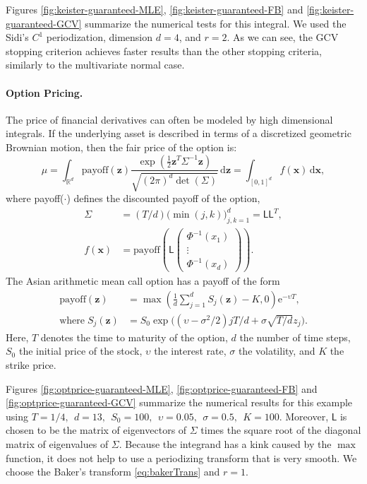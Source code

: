 \documentclass[twocolumn]{svjour3}          %
\newcommand{\bm}[1]{\boldsymbol{#1}}
\newcommand{\mSigma}{\mathsf{\Sigma}}
\newcommand{\dif}[1]{\text{d}{#1}}
\newcommand{\reals}{\mathbb{R}}
\newcommand{\vx}{\bm{x}}
\newcommand{\dvx}{\dif{\bm{x}}}
\newcommand{\vz}{\bm{z}}
\newcommand{\dvz}{\dif{\bm{z}}}
\newcommand{\mL}{\mathsf{L}}
\newcommand{\me}{\mathrm{e}}
\begin{document}
Figures \ref{fig:keister-guaranteed-MLE}, \ref{fig:keister-guaranteed-FB} and \ref{fig:keister-guaranteed-GCV} summarize the numerical tests for this integral.  We used the Sidi's $C^1$ periodization, dimension $d=4$, and $r=2$. 
As we can see, the GCV stopping criterion achieves faster results than the other stopping criteria, similarly to the multivariate normal case.

\paragraph{Option Pricing.}

The price of financial derivatives can often be modeled by high dimensional integrals. If the underlying asset is described in terms of a discretized geometric Brownian motion, then the fair price of the option is:
\begin{equation*}
\mu = \int_{\reals^d} \text{payoff}(\vz) \frac{\exp(\frac 12 \vz^T\mSigma^{-1}\vz)}{\sqrt{(2\pi)^d \det(\mSigma)}} \, \dvz = \int_{[0,1]^d} f(\vx) \, \dvx,
\end{equation*} 
where {payoff($\cdot$)} defines the discounted payoff of the option,
\begin{align*}
\mSigma &= (T/d) \bigl(\min(j,k) \bigr)_{j,k=1}^d = \mL \mL^T,\\
f(\vx) &= \text{payoff} \left(\mL 
\begin{pmatrix}
\Phi^{-1}(x_1) \\ \vdots \\ \Phi^{-1}(x_d)
\end{pmatrix} \right).
\end{align*}
The Asian arithmetic mean call option has a payoff of the form
\begin{align*}
\text{payoff}(\vz) &= \max\left( \frac 1d  \sum_{j=1}^d S_j(\vz) - K, 0 \right) \me^{-\upsilon T}, \\
\text{where}\;
S_j(\vz) &= S_0 \exp\bigl((\upsilon-\sigma^2/2)jT/d + \sigma \sqrt{T/d} z_j \bigr).
\end{align*}
Here, $T$ denotes the time to maturity of the option, $d$ the number of time steps, $S_0$ the initial price of the stock, $\upsilon$ the interest rate, $\sigma$ the volatility, and $K$ the strike price.  

Figures \ref{fig:optprice-guaranteed-MLE}, \ref{fig:optprice-guaranteed-FB} and 
\ref{fig:optprice-guaranteed-GCV} summarize the numerical results for this example using
$
T = 1/4, \ \ d = 13, \ \ S_0 = 100, \ \ \upsilon =  0.05, \ \ \sigma = 0.5, \ \ K = 100.
$
Moreover, $\mL$ is chosen to be the matrix of eigenvectors of $\mSigma$ times the square root of the diagonal matrix of eigenvalues of $\mSigma$.
Because the integrand has a kink caused by the $\max$ function, it does not help to use a periodizing transform that is very smooth.  We choose the Baker's transform \eqref{eq:bakerTrans} and $r = 1$.
\end{document}
